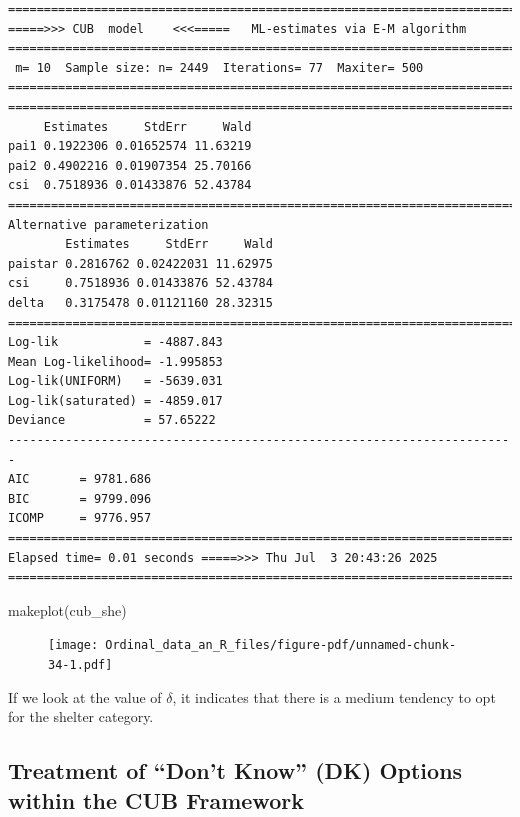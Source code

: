 \documentclass[
  letterpaper,
  DIV=11,
  numbers=noendperiod]{scrartcl}
\newenvironment{Shaded}{\begin{snugshade}}{\end{snugshade}}
\newcommand{\FunctionTok}[1]{\textcolor[rgb]{0.28,0.35,0.67}{#1}}
\newcommand{\NormalTok}[1]{\textcolor[rgb]{0.00,0.23,0.31}{#1}}
\begin{document}
\begin{verbatim}
======================================================================= 
=====>>> CUB  model    <<<=====   ML-estimates via E-M algorithm   
======================================================================= 
 m= 10  Sample size: n= 2449  Iterations= 77  Maxiter= 500 
======================================================================= 
======================================================================= 
     Estimates     StdErr     Wald
pai1 0.1922306 0.01652574 11.63219
pai2 0.4902216 0.01907354 25.70166
csi  0.7518936 0.01433876 52.43784
======================================================================= 
Alternative parameterization 
        Estimates     StdErr     Wald
paistar 0.2816762 0.02422031 11.62975
csi     0.7518936 0.01433876 52.43784
delta   0.3175478 0.01121160 28.32315
======================================================================= 
Log-lik            = -4887.843 
Mean Log-likelihood= -1.995853 
Log-lik(UNIFORM)   = -5639.031 
Log-lik(saturated) = -4859.017 
Deviance           = 57.65222 
----------------------------------------------------------------------- 
AIC       = 9781.686 
BIC       = 9799.096 
ICOMP     = 9776.957 
======================================================================= 
Elapsed time= 0.01 seconds =====>>> Thu Jul  3 20:43:26 2025 
======================================================================= 
\end{verbatim}

\begin{Shaded}
\begin{Highlighting}[]
\FunctionTok{makeplot}\NormalTok{(cub\_she)}
\end{Highlighting}
\end{Shaded}

\begin{figure}[H]

{\centering \texttt{[image: Ordinal\_data\_an\_R\_files/figure-pdf/unnamed-chunk-34-1.pdf]}

}

\end{figure}

If we look at the value of \(\delta\), it indicates that there is a
medium tendency to opt for the shelter category.

\hypertarget{treatment-of-dont-know-dk-options-within-the-cub-framework}{%
\subsection{Treatment of ``Don't Know'' (DK) Options within the CUB
Framework}\label{treatment-of-dont-know-dk-options-within-the-cub-framework}}
\end{document}

